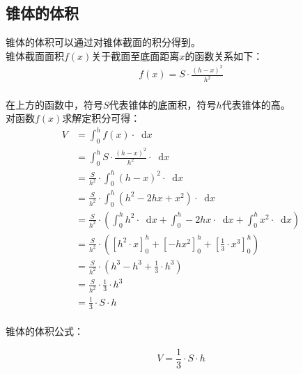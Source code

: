 \documentclass[UTF8]{ctexart}
\newcommand*{\dif}{\mathop{}\!\mathrm{d}}
\begin{document}
\newpage

\subsection{锥体的体积}
    锥体的体积可以通过对锥体截面的积分得到。\\[3mm]
    锥体截面面积$f(x)$关于截面至底面距离$x$的函数关系如下：
    \setcounter{equation}{0}
    \begin{align}
        f(x)=S\cdot\frac{(h-x)^2}{h^2}
    \end{align}\\
    在上方的函数中，符号$S$代表锥体的底面积，符号$h$代表锥体的高。\\[8mm]
    对函数$f(x)$求解定积分可得：\vspace{3pt}
    \begin{align}
        V
        &=\int_0^h f(x)\cdot\dif x\\[4mm]
        &=\int_0^h S\cdot\frac{(h-x)^2}{h^2}\cdot\dif x\\[4mm]
        &=\frac{S}{h^2}\cdot\int_0^h (h-x)^2\cdot\dif x\\[4mm]
        &=\frac{S}{h^2}\cdot\int_0^h \left(h^2-2hx+x^2\right)\cdot\dif x\\[4mm]
        &=\frac{S}{h^2}\cdot\left(\int_0^h h^2\cdot\dif x+\int_0^h -2hx\cdot\dif x+\int_0^h x^2\cdot\dif x\right)\\[4mm]
        &=\frac{S}{h^2}\cdot\left([h^2\cdot x]_0^h+[-hx^2]_0^h+\left[\frac{1}{3}\cdot x^3\right]_0^h\right)\\[4mm]
        &=\frac{S}{h^2}\cdot\left(h^3-h^3+\frac{1}{3}\cdot h^3\right)\\[4mm]
        &=\frac{S}{h^2}\cdot\frac{1}{3}\cdot h^3\\[4mm]
        &=\frac{1}{3}\cdot S\cdot h
    \end{align}\\
    锥体的体积公式：
    \begin{large}
        \begin{equation*}
            V=\frac{1}{3}\cdot S\cdot h
        \end{equation*}
    \end{large}

\newpage
\end{document}
